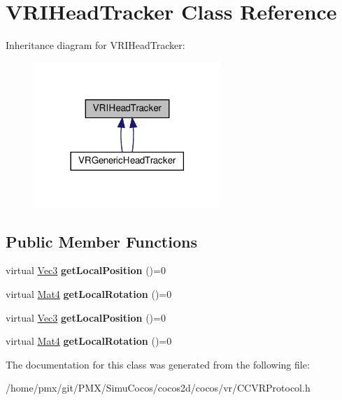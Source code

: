 \hypertarget{classVRIHeadTracker}{}\section{V\+R\+I\+Head\+Tracker Class Reference}
\label{classVRIHeadTracker}


Inheritance diagram for V\+R\+I\+Head\+Tracker\+:
\nopagebreak
\begin{figure}[H]
\begin{center}
\leavevmode
\includegraphics[width=201pt]{classVRIHeadTracker__inherit__graph}
\end{center}
\end{figure}
\subsection*{Public Member Functions}
\begin{DoxyCompactItemize}
\item 
\mbox{\label{classVRIHeadTracker_a29d274c319d3e655cf3f495f3157cad6}} 
virtual \hyperlink{classVec3}{Vec3} {\bfseries get\+Local\+Position} ()=0
\item 
\mbox{\label{classVRIHeadTracker_a389c446e3204b500ce16fe94811bfa53}} 
virtual \hyperlink{classMat4}{Mat4} {\bfseries get\+Local\+Rotation} ()=0
\item 
\mbox{\label{classVRIHeadTracker_a29d274c319d3e655cf3f495f3157cad6}} 
virtual \hyperlink{classVec3}{Vec3} {\bfseries get\+Local\+Position} ()=0
\item 
\mbox{\label{classVRIHeadTracker_a389c446e3204b500ce16fe94811bfa53}} 
virtual \hyperlink{classMat4}{Mat4} {\bfseries get\+Local\+Rotation} ()=0
\end{DoxyCompactItemize}


The documentation for this class was generated from the following file\+:\begin{DoxyCompactItemize}
\item 
/home/pmx/git/\+P\+M\+X/\+Simu\+Cocos/cocos2d/cocos/vr/C\+C\+V\+R\+Protocol.\+h\end{DoxyCompactItemize}
